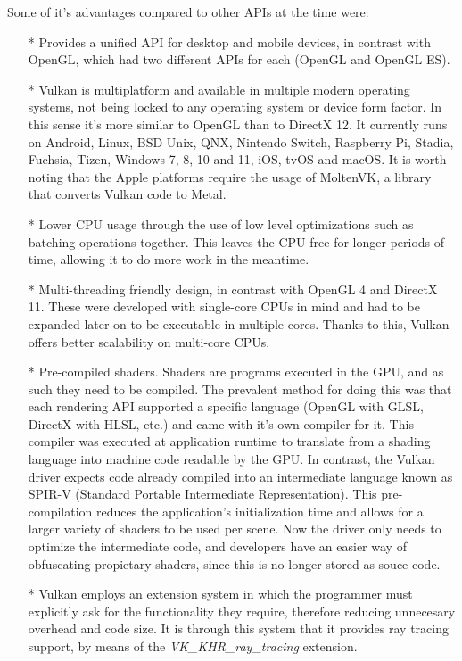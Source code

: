 Some of it's advantages compared to other APIs at the time were:
\begin{itemize}
  \item[*]{Provides a unified API for desktop and mobile devices, in contrast with OpenGL, which had two different APIs for each (OpenGL and OpenGL ES).}
  \item[*]{Vulkan is multiplatform and available in multiple modern operating systems, not being locked to any operating system or device form factor. In this sense it's more similar to OpenGL than to DirectX 12. It currently runs on Android, Linux, BSD Unix, QNX, Nintendo Switch, Raspberry Pi, Stadia, Fuchsia, Tizen, Windows 7, 8, 10 and 11, iOS, tvOS and macOS. It is worth noting that the Apple platforms require the usage of MoltenVK, a library that converts Vulkan code to Metal.}
  \item[*]{Lower CPU usage through the use of low level optimizations such as batching operations together. This leaves the CPU free for longer periods of time, allowing it to do more work in the meantime.}
  \item[*]{Multi-threading friendly design, in contrast with OpenGL 4 and DirectX 11. These were developed with single-core CPUs in mind and had to be expanded later on to be executable in multiple cores. Thanks to this, Vulkan offers better scalability on multi-core CPUs.}
  \item[*]{Pre-compiled shaders. Shaders are programs executed in the GPU, and as such they need to be compiled. The prevalent method for doing this was that each rendering API supported a specific language (OpenGL with GLSL, DirectX with HLSL, etc.) and came with it's own compiler for it. This compiler was executed at application runtime to translate from a shading language into machine code readable by the GPU. In contrast, the Vulkan driver expects code already compiled into an intermediate language known as SPIR-V (Standard Portable Intermediate Representation). This pre-compilation reduces the application's initialization time and allows for a larger variety of shaders to be used per scene. Now the driver only needs to optimize the intermediate code, and developers have an easier way of obfuscating propietary shaders, since this is no longer stored as souce code.}
  \item[*]{Vulkan employs an extension system in which the programmer must explicitly ask for the functionality they require, therefore reducing unnecesary overhead and code size. It is through this system that it provides ray tracing support, by means of the \textit{VK\_KHR\_ray\_tracing} extension.}
\end{itemize}

